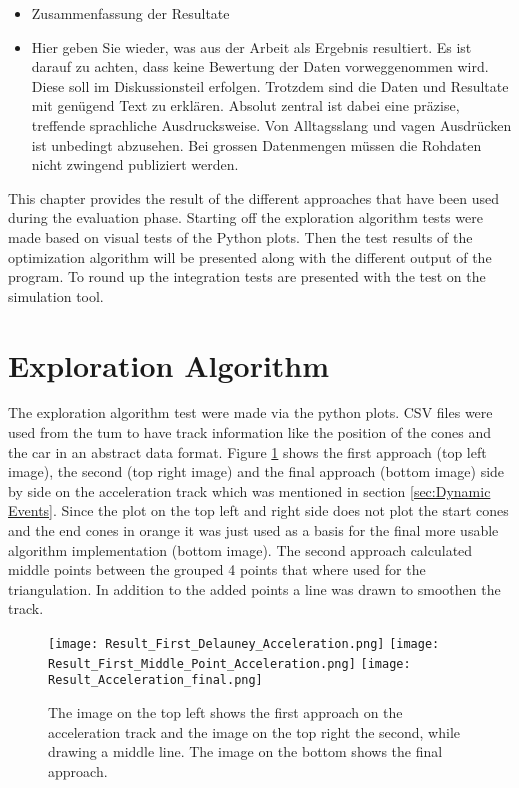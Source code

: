 \begin{itemize}
    \item Zusammenfassung der Resultate
    \item Hier geben Sie wieder, was aus der Arbeit als Ergebnis resultiert. Es ist darauf zu achten, dass keine Bewertung der Daten vorweggenommen wird. Diese soll im Diskussionsteil erfolgen. Trotzdem sind die Daten und Resultate mit genügend Text zu erklären. Absolut zentral ist dabei eine präzise, treffende sprachliche Ausdrucksweise. Von Alltagsslang und vagen Ausdrücken ist unbedingt abzusehen.
          Bei grossen Datenmengen müssen die Rohdaten nicht zwingend publiziert werden.
\end{itemize}

This chapter provides the result of the different approaches that have been used during the evaluation phase. Starting off the exploration algorithm tests were made based on visual tests of the Python plots. Then the test results of the optimization algorithm will be presented along with the different output of the program. To round up the integration tests are presented with the test on the simulation tool.

\section{Exploration Algorithm}
The exploration algorithm test were made via the python plots. CSV files were used from the \acrlong{tum} to have track information like the position of the cones and the car in an abstract data format. \cite{tumftm_optimization_algoritm} Figure \ref{fig:Result acceleration} shows the first approach (top left image), the second (top right image) and the final approach (bottom image) side by side on the acceleration track which was mentioned in section \ref{sec:Dynamic Events}. Since the plot on the top left and right side does not plot the start cones and the end cones in orange it was just used as a basis for the final more usable algorithm implementation (bottom image). The second approach calculated middle points between the grouped 4 points that where used for the triangulation. In addition to the added points a line was drawn to smoothen the track.

\begin{figure}[H]
    \centering
    \texttt{[image: Result\_First\_Delauney\_Acceleration.png]}\hfill
    \texttt{[image: Result\_First\_Middle\_Point\_Acceleration.png]}
    \texttt{[image: Result\_Acceleration\_final.png]}
    \caption{The image on the top left shows the first approach on the acceleration track and the image on the top right the second, while drawing a middle line. The image on the bottom shows the final approach.}
    \label{fig:Result acceleration}
\end{figure}

